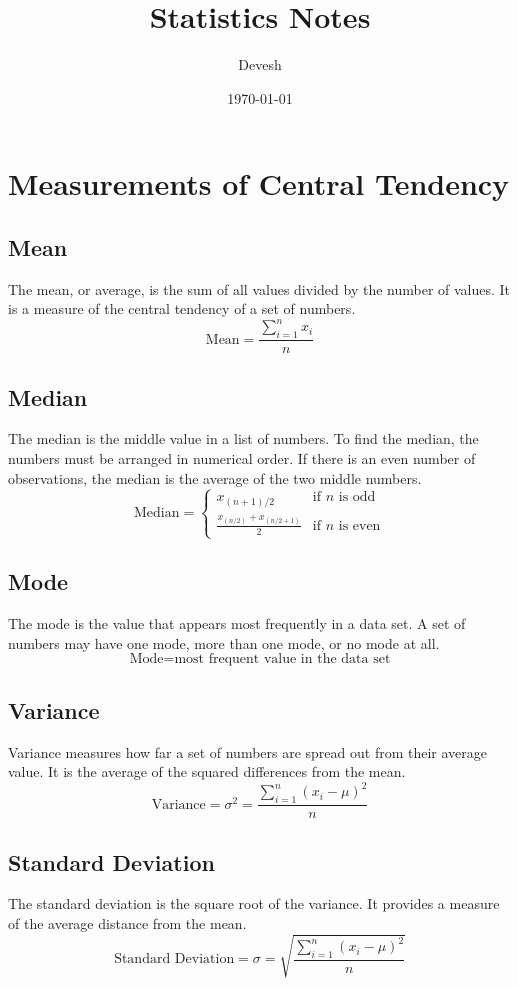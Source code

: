 \documentclass{article}
\begin{document}
\title{Statistics Notes}
\author{Devesh}
\date{\today}

\maketitle

\section{Measurements of Central Tendency}
\subsection{Mean}
The mean, or average, is the sum of all values divided by the number of values. It is a measure of the central tendency of a set of numbers.
\[
\text{Mean} = \frac{\sum_{i=1}^{n} x_i}{n}
\]

\subsection{Median}
The median is the middle value in a list of numbers. To find the median, the numbers must be arranged in numerical order. If there is an even number of observations, the median is the average of the two middle numbers.
\[
\text{Median} = 
\begin{cases} 
x_{(n+1)/2} & \text{if } n \text{ is odd} \\
\frac{x_{(n/2)} + x_{(n/2 + 1)}}{2} & \text{if } n \text{ is even}
\end{cases}
\]

\subsection{Mode}
The mode is the value that appears most frequently in a data set. A set of numbers may have one mode, more than one mode, or no mode at all.
\[
\text{Mode} = \text{most frequent value in the data set}
\]

\subsection{Variance}
Variance measures how far a set of numbers are spread out from their average value. It is the average of the squared differences from the mean.
\[
\text{Variance} = \sigma^2 = \frac{\sum_{i=1}^{n} (x_i - \mu)^2}{n}
\]

\subsection{Standard Deviation}
The standard deviation is the square root of the variance. It provides a measure of the average distance from the mean.
\[
\text{Standard Deviation} = \sigma = \sqrt{\frac{\sum_{i=1}^{n} (x_i - \mu)^2}{n}}
\]
\end{document}
